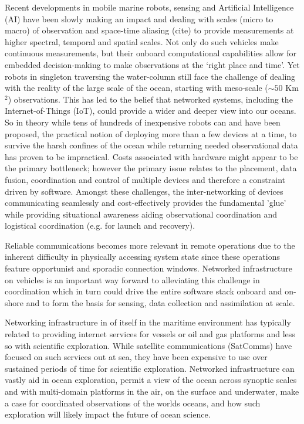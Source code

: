 Recent developments in mobile marine robots, sensing and Artificial
Intelligence (AI) have been slowly making an impact and dealing with
scales (micro to macro) of observation and space-time aliasing (cite) to
provide measurements at higher spectral, temporal and spatial
scales. Not only do such vehicles make continuous measurements, but
their onboard computational capabilities allow for embedded
decision-making to make observations at the `right place and time'. Yet
robots in singleton traversing the water-column still face the challenge
of dealing with the reality of the large scale of the ocean, starting
with meso-scale ($\sim 50$ Km$^2$) observations. This has led to the
belief that networked systems, including the Internet-of-Things (IoT),
could provide a wider and deeper view into our oceans. So in theory
while tens of hundreds of inexpensive robots can and have been proposed,
the practical notion of deploying more than a few devices at a time, to
survive the harsh confines of the ocean while returning needed
observational data has proven to be impractical.  Costs associated with
hardware might appear to be the primary bottleneck; however the primary
issue relates to the placement, data fusion, coordination and control of
multiple devices and therefore a constraint driven by software. Amongst
these challenges, the inter-networking of devices communicating
seamlessly and cost-effectively provides the fundamental 'glue' while
providing situational awareness aiding observational coordination and
logistical coordination (e.g. for launch and recovery).

Reliable communications becomes more relevant in remote operations due
to the inherent difficulty in physically accessing system state since
these operations feature opportunist and sporadic connection windows.
Networked infrastructure on vehicles is an important way forward to
alleviating this challenge in coordination which in turn could drive
the entire software stack onboard and on-shore and to form the basis
for sensing, data collection and assimilation at scale. 

Networking infrastructure in of itself in the maritime environment has
typically related to providing internet services for vessels or oil and
gas platforms \cite{jiang19,yau19,yau20} and less so with scientific
exploration. While satellite communications (SatComms) have focused on
such services out at sea, they have been expensive to use over sustained
periods of time for scientific exploration.  Networked infrastructure
can vastly aid in ocean exploration, permit a view of the ocean across
synoptic scales and with multi-domain platforms in the air, on the
surface and underwater, make a case for coordinated observations of the
worlds oceans, and how such exploration will likely impact the future of
ocean science. 

